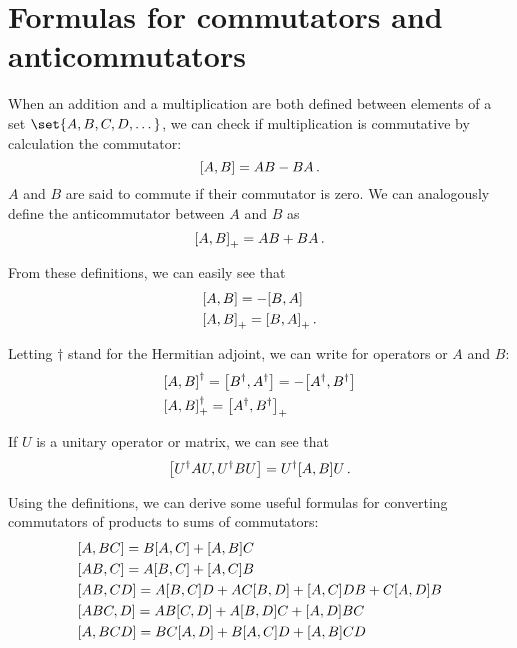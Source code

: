 \section{Formulas for commutators and anticommutators}
    When an addition and a multiplication are both defined between elements of a set $\set{A, B, C, D, \dots}$, we can check if multiplication is commutative by calculation the commutator:
    \begin{equation}
        \comm{A}{B} = AB - BA \thinspace .
    \end{equation}
    $A$ and $B$ are said to commute if their commutator is zero. We can analogously define the anticommutator between $A$ and $B$ as
    \begin{equation}
        \comm{A}{B}_+ = AB + BA \thinspace .
    \end{equation}

    From these definitions, we can easily see that
    \begin{align}
        & \comm{A}{B} = - \comm{B}{A} \\
        & \comm{A}{B}_+ = \comm{B}{A}_+ \thinspace .
    \end{align}

    Letting $\dagger$ stand for the Hermitian adjoint, we can write for operators or $A$ and $B$:
    \begin{align}
        & \comm{A}{B}^\dagger = \comm{B^\dagger}{A^\dagger} = - \comm{A^\dagger}{B^\dagger} \\
        & \comm{A}{B}^\dagger_+ = \comm{A^\dagger}{B^\dagger}_+
    \end{align}

    If $U$ is a unitary operator or matrix, we can see that
    \begin{equation}
        \comm{U^\dagger A U}{U^\dagger B U } = U^\dagger \comm{A}{B} U \thinspace .
    \end{equation}

    Using the definitions, we can derive some useful formulas for converting commutators of products to sums of commutators:
    \begin{align}
        & \comm{A}{BC} = B \comm{A}{C} + \comm{A}{B} C \\
        & \comm{AB}{C} = A \comm{B}{C} + \comm{A}{C}B \\
        & \comm{AB}{CD} = A \comm{B}{C} D + AC \comm{B}{D} + \comm{A}{C} DB + C \comm{A}{D} B \\
        & \comm{ABC}{D} = AB \comm{C}{D} + A \comm{B}{D} C + \comm{A}{D} BC \\
        & \comm{A}{BCD} = BC \comm{A}{D} + B \comm{A}{C} D + \comm{A}{B} CD
    \end{align}

